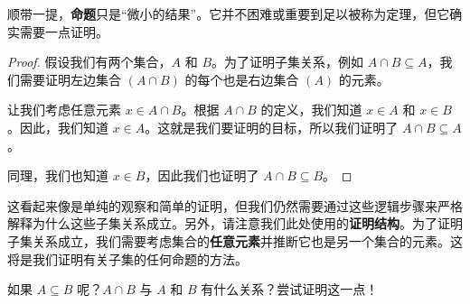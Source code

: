 顺带一提，\textbf{命题}只是``微小的结果''。它并不困难或重要到足以被称为定理，但它确实需要一点证明。

\begin{proof}
    假设我们有两个集合，$A$ 和 $B$。为了证明子集关系，例如 $A \cap B \subseteq A$，我们需要证明左边集合 $(A \cap B)$ 的每个也是右边集合 $(A)$ 的元素。

    让我们考虑任意元素 $x \in A \cap B$。根据 $A \cap B$ 的定义，我们知道 $x \in A$ 和 $x \in B$。因此，我们知道 $x \in A$。这就是我们要证明的目标，所以我们证明了 $A \cap B \subseteq A$。

    同理，我们也知道 $x \in B$，因此我们也证明了 $A \cap B \subseteq B$。
\end{proof}

这看起来像是单纯的观察和简单的证明，但我们仍然需要通过这些逻辑步骤来严格解释为什么这些子集关系成立。另外，请注意我们此处使用的\textbf{证明结构}。为了证明子集关系成立，我们需要考虑集合的\textbf{任意元素}并推断它也是另一个集合的元素。这将是我们证明有关子集的任何命题的方法。

如果 $A \subseteq B$ 呢？$A \cap B$ 与 $A$ 和 $B$ 有什么关系？尝试证明这一点！
